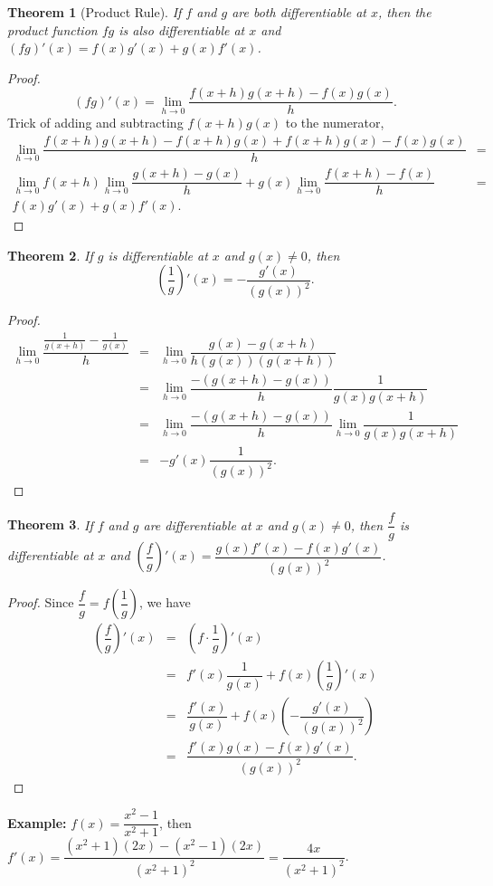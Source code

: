 \documentclass[titlepage,a4paper,12pt]{report}
\newtheorem{theorem}{Theorem}[section]
\begin{document}
\begin{theorem}[Product Rule]
If $f$ and $g$ are both differentiable at $x$, then the product function $fg$ is also differentiable at $x$ and $(fg)'(x)=f(x)g'(x)+g(x)f'(x)$.
\end{theorem}
\begin{proof}
\begin{equation*}
(fg)'(x)=\lim _{h\rightarrow 0}\dfrac{f(x+h)g(x+h)-f(x)g(x)}{h}.
\end{equation*}
Trick of adding and subtracting $f(x+h)g(x)$ to the numerator,
\begin{eqnarray*}
\lim _{h\rightarrow 0}\dfrac{f(x+h)g(x+h)-f(x+h)g(x)+f(x+h)g(x)-f(x)g(x)}{h} &=&\\
\lim _{h\rightarrow 0} {f(x+h)}\lim _{h\rightarrow 0}\dfrac{g(x+h)-g(x)}{h}+g(x)\lim _{h\rightarrow 0}\dfrac{f(x+h)-f(x)}{h} &=&\\
f(x)g'(x)+g(x)f'(x).
\end{eqnarray*}
\end{proof}
\begin{theorem}
If $g$ is differentiable at $x$ and $g(x)\neq 0$, then 
\begin{equation*}
\left(\dfrac{1}{g}\right)'(x)=-\dfrac{g'(x)}{(g(x))^2}.
\end{equation*}
\end{theorem}
\begin{proof}
\begin{eqnarray*}
\lim _{h\rightarrow 0} \dfrac{\frac{1}{g(x+h)}-\frac{1}{g(x)}}{h} &=& \lim _{h\rightarrow 0}\dfrac{g(x)-g(x+h)}{h(g(x))(g(x+h))}\\
&=& \lim _{h\rightarrow 0} \dfrac{-(g(x+h)-g(x))}{h}\dfrac{1}{g(x)g(x+h)}\\
&=& \lim _{h\rightarrow 0} \dfrac{-(g(x+h)-g(x))}{h} \lim _{h\rightarrow 0}\dfrac{1}{g(x)g(x+h)}\\
&=& -g'(x)\dfrac{1}{(g(x))^2}.
\end{eqnarray*}
\end{proof}
\begin{theorem}
If $f$ and $g$ are differentiable at $x$ and $g(x)\neq 0$, then $\dfrac{f}{g}$ is differentiable at $x$ and 
$\left(\dfrac{f}{g}\right)'(x)=\dfrac{g(x)f'(x)-f(x)g'(x)}{(g(x))^2} $.
\end{theorem}
\begin{proof}
Since $\dfrac{f}{g}=f\left(\dfrac{1}{g}\right)$, we have
\begin{eqnarray*}
\left(\dfrac{f}{g}\right)'(x) &=&\left(f\cdot \dfrac{1}{g}\right)'(x)\\
&=& f'(x)\dfrac{1}{g(x)}+f(x)\left(\dfrac{1}{g}\right)'(x)\\
&=& \dfrac{f'(x)}{g(x)}+f(x)\left(-\dfrac{g'(x)}{(g(x))^2}\right)\\
&=& \dfrac{f'(x)g(x)-f(x)g'(x)}{(g(x))^2}.
\end{eqnarray*}
\end{proof}
\textbf{Example:} $f(x)=\dfrac{x^2-1}{x^2+1}$, then $f'(x)=\dfrac{(x^2+1)(2x)-(x^2-1)(2x)}{(x^2+1)^2}=\dfrac{4x}{(x^2+1)^2}$.
\end{document}
